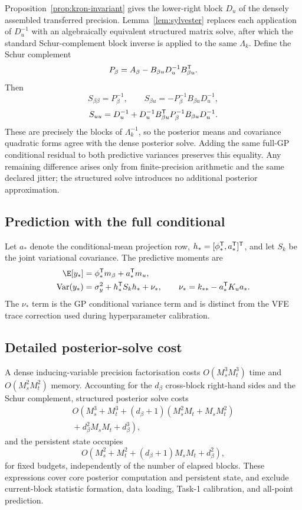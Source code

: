 Proposition~\ref{prop:kron-invariant} gives the lower-right block
$D_u$ of the densely assembled transferred precision. Lemma~\ref{lem:sylvester}
replaces each application of $D_u^{-1}$ with an algebraically equivalent structured matrix
solve, after which the standard Schur-complement block inverse is applied to the
same $\Lambda_k$. Define the Schur complement
\[
P_\beta=A_\beta-B_{\beta u}D_u^{-1}B_{\beta u}^{\mathsf T}.
\]
Then
\[
S_{\beta\beta}=P_\beta^{-1},\qquad
S_{\beta u}=-P_\beta^{-1}B_{\beta u}D_u^{-1},
\]
\[
S_{uu}=D_u^{-1}+D_u^{-1}B_{\beta u}^{\mathsf T}
P_\beta^{-1}B_{\beta u}D_u^{-1}.
\]
These are precisely the blocks of $\Lambda_k^{-1}$, so the posterior means and
covariance quadratic forms agree with the dense posterior solve. Adding the same full-GP
conditional residual to both predictive variances preserves this equality. Any
remaining difference arises only from finite-precision arithmetic and the same
declared jitter; the structured solve introduces no additional posterior approximation.

\subsection{Prediction with the full conditional}

Let $a_*$ denote the conditional-mean projection row, $h_*=[\phi_*^{\mathsf T},a_*^{\mathsf T}]^{\mathsf T}$, and let $S_k$ be the joint variational covariance. The predictive moments are
\begin{align}
 \E[y_*]&=\phi_*^{\trans}m_\beta+a_*^{\trans}m_u,\\
 \operatorname{Var}(y_*)&=\sigma_y^2+h_*^{\trans}S_kh_*+\nu_*,
 \qquad
 \nu_*=k_{**}-a_*^{\trans}K_ua_*.
\end{align}
The $\nu_*$ term is the GP conditional variance term and is distinct from the VFE trace correction used during hyperparameter calibration.

\subsection{Detailed posterior-solve cost}
\label{app:complexity}
A dense inducing-variable precision factorisation costs $O(M_s^3M_t^3)$ time and
$O(M_s^2M_t^2)$ memory. Accounting for the $d_\beta$ cross-block right-hand
sides and the Schur complement, structured posterior solve costs
\begin{multline}
 O\!\left(M_s^3+M_t^3+(d_\beta+1)
 (M_s^2M_t+M_sM_t^2)\right.\\
 \left.{}+d_\beta^2M_sM_t+d_\beta^3\right),
 \label{eq:recovery-cost}
\end{multline}
and the persistent state occupies
\begin{equation}
 O(M_s^2+M_t^2+(d_\beta+1)M_sM_t+d_\beta^2),
 \label{eq:state-cost}
\end{equation}
for fixed budgets, independently of the number of elapsed blocks. These expressions
cover core posterior computation and persistent state, and exclude current-block
statistic formation, data loading, Task-1 calibration, and all-point prediction.

